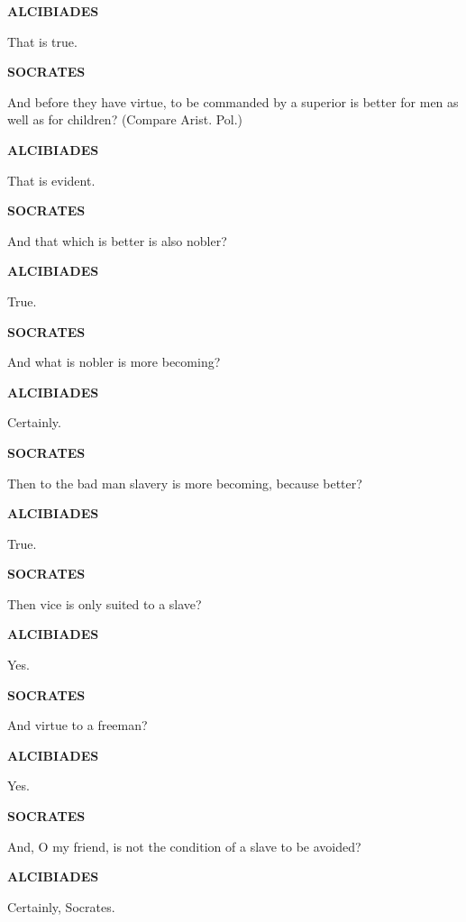 \documentclass[11pt,letter]{article}
\begin{document}
\par \textbf{ALCIBIADES}
\par   That is true.

\par \textbf{SOCRATES}
\par   And before they have virtue, to be commanded by a superior is better for men as well as for children? (Compare Arist. Pol.)

\par \textbf{ALCIBIADES}
\par   That is evident.

\par \textbf{SOCRATES}
\par   And that which is better is also nobler?

\par \textbf{ALCIBIADES}
\par   True.

\par \textbf{SOCRATES}
\par   And what is nobler is more becoming?

\par \textbf{ALCIBIADES}
\par   Certainly.

\par \textbf{SOCRATES}
\par   Then to the bad man slavery is more becoming, because better?

\par \textbf{ALCIBIADES}
\par   True.

\par \textbf{SOCRATES}
\par   Then vice is only suited to a slave?

\par \textbf{ALCIBIADES}
\par   Yes.

\par \textbf{SOCRATES}
\par   And virtue to a freeman?

\par \textbf{ALCIBIADES}
\par   Yes.

\par \textbf{SOCRATES}
\par   And, O my friend, is not the condition of a slave to be avoided?

\par \textbf{ALCIBIADES}
\par   Certainly, Socrates.
\end{document}
